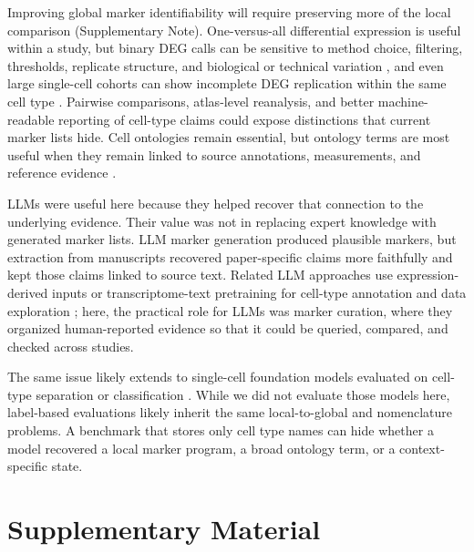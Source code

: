 \documentclass[10pt,twocolumn]{article}
\theoremstyle{plain}
\theoremstyle{definition}
\theoremstyle{remark}
\begin{document}
Improving global marker identifiability will require preserving more of the local comparison (Supplementary Note). One-versus-all differential expression is useful within a study, but binary DEG calls can be sensitive to method choice, filtering, thresholds, replicate structure, and biological or technical variation \citep{Soneson_2018,Squair_2021,Hoerbst2025DEG}, and even large single-cell cohorts can show incomplete DEG replication within the same cell type \citep{Krzak2026CrohnReplicability}. Pairwise comparisons, atlas-level reanalysis, and better machine-readable reporting of cell-type claims \citep{Lubiana2022MIRACL} could expose distinctions that current marker lists hide. Cell ontologies remain essential, but ontology terms are most useful when they remain linked to source annotations, measurements, and reference evidence \citep{OsumiSutherland2021CellOntologies,tan2026cellontologyagesinglecell}.

LLMs were useful here because they helped recover that connection to the underlying evidence. Their value was not in replacing expert knowledge with generated marker lists. LLM marker generation produced plausible markers, but extraction from manuscripts recovered paper-specific claims more faithfully and kept those claims linked to source text. Related LLM approaches use expression-derived inputs or transcriptome-text pretraining for cell-type annotation and data exploration \citep{Hou_2024,Levine2023Cell2Sentence,Zhao2024LangCell,Schaefer2025CellWhisperer,Yang2025LLMConsensus}; here, the practical role for LLMs was marker curation, where they organized human-reported evidence so that it could be queried, compared, and checked across studies.

The same issue likely extends to single-cell foundation models evaluated on cell-type separation or classification \citep{Kedzierska2025ZeroShotFoundation}. While we did not evaluate those models here, label-based evaluations likely inherit the same local-to-global and nomenclature problems. A benchmark that stores only cell type names can hide whether a model recovered a local marker program, a broad ontology term, or a context-specific state.

\clearpage
\newpage
\onecolumn
\appendix
\setcounter{figure}{0}
\setcounter{table}{0}
\renewcommand{\thefigure}{S\arabic{figure}}
\renewcommand{\thetable}{S\arabic{table}}

\section{Supplementary Material}
\end{document}
